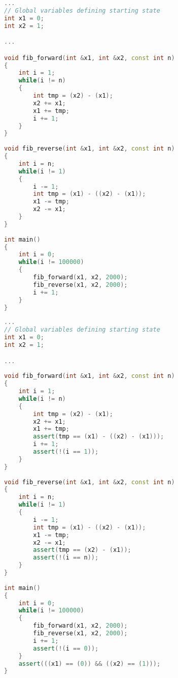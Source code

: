 \begin{varwidth}[t]{0.45\textwidth}
\begin{lstlisting}[language=C++, caption={Optimized Fibonacci program.}]
...
// Global variables defining starting state
int x1 = 0;
int x2 = 1;

...

void fib_forward(int &x1, int &x2, const int n)
{
    int i = 1;
    while(i != n)
    {
        int tmp = (x2) - (x1);
        x2 += x1;
        x1 += tmp;
        i += 1;
    }
}
 
void fib_reverse(int &x1, int &x2, const int n)
{
    int i = n;
    while(i != 1)
    {
        i -= 1;
        int tmp = (x1) - ((x2) - (x1));
        x1 -= tmp;
        x2 -= x1;
    }
}
 
int main()
{
    int i = 0;
    while(i != 100000)
    {
        fib_forward(x1, x2, 2000);
        fib_reverse(x1, x2, 2000);
        i += 1;
    }
}
\end{lstlisting}
\end{varwidth}
\hspace{4em}
\begin{varwidth}[t]{0.45\textwidth}
\begin{lstlisting}[language=C++, caption={Unoptimized Fibonacci program.}]
... 
// Global variables defining starting state
int x1 = 0;
int x2 = 1;

...
  
void fib_forward(int &x1, int &x2, const int n)
{
    int i = 1;
    while(i != n)
    {
        int tmp = (x2) - (x1);
        x2 += x1;
        x1 += tmp;
        assert(tmp == (x1) - ((x2) - (x1)));
        i += 1;
        assert(!(i == 1));
    }
}
    
void fib_reverse(int &x1, int &x2, const int n)
{
    int i = n;
    while(i != 1)
    {
        i -= 1;
        int tmp = (x1) - ((x2) - (x1));
        x1 -= tmp;
        x2 -= x1;
        assert(tmp == (x2) - (x1));
        assert(!(i == n));
    }
}
    
int main()
{
    int i = 0;
    while(i != 100000)
    {
        fib_forward(x1, x2, 2000);
        fib_reverse(x1, x2, 2000);
        i += 1;
        assert(!(i == 0));
    }
    assert(((x1) == (0)) && ((x2) == (1)));
}
\end{lstlisting}
\end{varwidth}